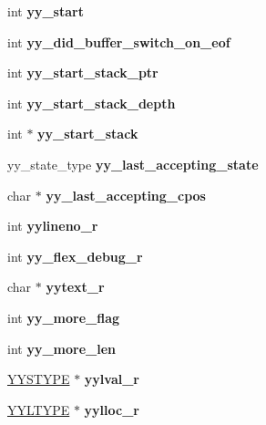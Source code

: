 \begin{DoxyCompactItemize}
\mbox{\label{structyyguts__t_a8baf7d47fe53035d9bc2a9670795ff01}} 
int {\bfseries yy\+\_\+start}
\item 
\mbox{\label{structyyguts__t_a2daec411627700709ef2fd927e69627d}} 
int {\bfseries yy\+\_\+did\+\_\+buffer\+\_\+switch\+\_\+on\+\_\+eof}
\item 
\mbox{\label{structyyguts__t_ad9e132dacc2904a8ae76c64c72e33795}} 
int {\bfseries yy\+\_\+start\+\_\+stack\+\_\+ptr}
\item 
\mbox{\label{structyyguts__t_a35bedf1c17debd766565b99c39132eb4}} 
int {\bfseries yy\+\_\+start\+\_\+stack\+\_\+depth}
\item 
\mbox{\label{structyyguts__t_af6e2e45a5fdba0f313c680b35da4292a}} 
int $\ast$ {\bfseries yy\+\_\+start\+\_\+stack}
\item 
\mbox{\label{structyyguts__t_a84e01a3658729e9d69f79feb3faf1c99}} 
yy\+\_\+state\+\_\+type {\bfseries yy\+\_\+last\+\_\+accepting\+\_\+state}
\item 
\mbox{\label{structyyguts__t_a46fb8d232ed375921af0b37caeeb67c4}} 
char $\ast$ {\bfseries yy\+\_\+last\+\_\+accepting\+\_\+cpos}
\item 
\mbox{\label{structyyguts__t_aa9f13776b8d311e847cc7d974d49af4c}} 
int {\bfseries yylineno\+\_\+r}
\item 
\mbox{\label{structyyguts__t_a5ad72d75ed6d693824fe7e02ce21118e}} 
int {\bfseries yy\+\_\+flex\+\_\+debug\+\_\+r}
\item 
\mbox{\label{structyyguts__t_aebaa731ad6cbe2411d104925e5bb3f2c}} 
char $\ast$ {\bfseries yytext\+\_\+r}
\item 
\mbox{\label{structyyguts__t_a664a72171cc3e720fcb8120af9b72883}} 
int {\bfseries yy\+\_\+more\+\_\+flag}
\item 
\mbox{\label{structyyguts__t_a683563bf4cd73f25b4c7b78579c1330e}} 
int {\bfseries yy\+\_\+more\+\_\+len}
\item 
\mbox{\label{structyyguts__t_a55dbdcd46a36d34adcbfc29be44d10cf}} 
\mbox{\hyperlink{unionYYSTYPE}{Y\+Y\+S\+T\+Y\+PE}} $\ast$ {\bfseries yylval\+\_\+r}
\item 
\mbox{\label{structyyguts__t_ab8e55a82f463922752514b4baf40621d}} 
\mbox{\hyperlink{structYYLTYPE}{Y\+Y\+L\+T\+Y\+PE}} $\ast$ {\bfseries yylloc\+\_\+r}
\end{DoxyCompactItemize}


